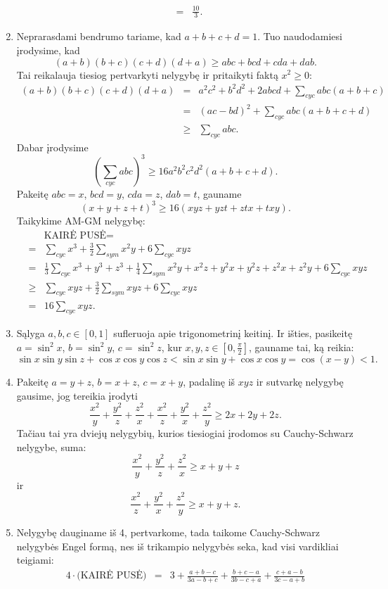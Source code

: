 \begin{enumerate}
\begin{eqnarray*}
    &=&\frac{10}{3}.\end{eqnarray*}
\item
    Neprarasdami bendrumo tariame, kad $a+b+c+d=1$. Tuo naudodamiesi
    įrodysime, kad $$(a+b)(b+c)(c+d)(d+a)\geq abc+bcd+cda+dab.$$ Tai
    reikalauja tiesiog pertvarkyti nelygybę ir pritaikyti faktą
    $x^2\geq0$:
    \begin{eqnarray*}(a+b)(b+c)(c+d)(d+a)&=&a^2c^2+b^2d^2+2abcd+\sum_{cyc}{abc(a+b+c)}\\
    &=&(ac-bd)^2+\sum_{cyc}{abc(a+b+c+d)}\\&\geq&\sum_{cyc}{abc}.\end{eqnarray*}
    Dabar įrodysime
    $$\left(\sum_{cyc}{abc}\right)^3\geq16a^2b^2c^2d^2(a+b+c+d).$$ Pakeitę
    $abc=x$, $bcd=y$, $cda=z$, $dab=t$, gauname
    $$(x+y+z+t)^3\geq16(xyz+yzt+ztx+txy).$$ Taikykime AM-GM nelygybę: \begin{eqnarray*}&&\text{KAIRĖ
    PUSĖ}=\\&=&\sum_{cyc}{x^3}+\frac{3}{2}\sum_{sym}{x^2y}+6\sum_{cyc}{xyz}\\
    &=&\frac{1}{3}\sum_{cyc}{x^3+y^3+z^3}+\frac{1}{4}\sum_{sym}{x^2y+x^2z+y^2x+y^2z+z^2x+z^2y}+6\sum_{cyc}{xyz}\\
    &\geq&\sum_{cyc}{xyz}+\frac{3}{2}\sum_{sym}{xyz}+6\sum_{cyc}{xyz}\\&=&16\sum_{cyc}{xyz}.\end{eqnarray*}
\item
    Sąlyga $a,b,c\in[0,1]$ sufleruoja apie trigonometrinį keitinį. Ir
    išties, pasikeitę $a=\sin^2x$, $b=\sin^2y$, $c=\sin^2z$, kur
    $x,y,z\in[0,\frac{\pi}{2}]$, gauname tai, ką reikia: $$\sin x\sin
    y\sin z+\cos x\cos y\cos z<\sin x\sin y+\cos x\cos y=\cos(x-y)<1.$$
\item
    Pakeitę $a=y+z$, $b=x+z$, $c=x+y$, padalinę iš $xyz$ ir sutvarkę
    nelygybę gausime, jog tereikia įrodyti
    $$\frac{x^2}{y}+\frac{y^2}{z}+\frac{z^2}{x}+\frac{x^2}{z}+\frac{y^2}{x}+\frac{z^2}{y}\geq
    2x+2y+2z.$$ Tačiau tai yra dviejų nelygybių, kurios tiesiogiai
    įrodomos su Cauchy-Schwarz nelygybe, suma:
    $$\frac{x^2}{y}+\frac{y^2}{z}+\frac{z^2}{x}\geq x+y+z$$ ir
    $$\frac{x^2}{z}+\frac{y^2}{x}+\frac{z^2}{y}\geq x+y+z.$$
\item
    Nelygybę dauginame iš 4, pertvarkome, tada taikome Cauchy-Schwarz
    nelygybės Engel formą, nes iš trikampio nelygybės seka, kad visi
    vardikliai teigiami: \begin{eqnarray*}4\cdot\text{(KAIRĖ
    PUSĖ)}&=&3+\frac{a+b-c}{3a-b+c}+\frac{b+c-a}{3b-c+a}+\frac{c+a-b}{3c-a+b}\\

\end{eqnarray*}
\end{enumerate}
